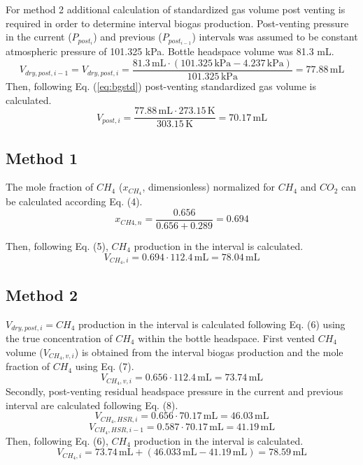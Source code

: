 \documentclass[]{article}
\newcommand{\unit}[1]{\ensuremath{\, \mathrm{#1}}}
\begin{document}
For method 2 additional calculation of standardized gas volume post venting is required in order to determine interval biogas production. 
Post-venting pressure in the current ($P_{post_{i}}$) and previous ($P_{post_{i-1}}$) intervals was assumed to be constant atmospheric pressure of 101.325 kPa. 
Bottle headspace volume was 81.3 mL. 
\begin{equation*}
   V_{dry,post,i-1} = V_{dry,post,i} = \frac{81.3\unit{mL} \cdot (101.325\unit{kPa} - 4.237\unit{kPa})}{101.325\unit{kPa}} = 77.88\unit{mL}  
\end{equation*}
Then, following Eq. (\ref{eq:bgstd}) post-venting standardized gas volume is calculated.
\begin{equation*}
    V_{post,i} = \frac{77.88\unit{mL} \cdot 273.15\unit{K}}{303.15\unit{K}} = 70.17\unit{mL}  
\end{equation*}

\subsection{Method 1}
The mole fraction of $CH_{4}$ ($x_{CH_4}$, dimensionless) normalized for $CH_{4}$ and $CO_{2}$ can be calculated according Eq. (4).
\begin{equation*}
    x_{CH{4},n} = \frac{0.656}{0.656 + 0.289} = 0.694
\end{equation*}

Then, following Eq. (5), $CH_{4}$ production in the interval is calculated.
\begin{equation*}
  V_{CH_4, i} = 0.694 \cdot 112.4\unit{mL}  = 78.04\unit{mL} 
\end{equation*}

\subsection{Method 2}
$V_{dry,post,i} =CH_{4}$ production in the interval is calculated following Eq. (6) using the true concentration of $CH_{4}$ within the bottle headspace.
First vented $CH_{4}$ volume ($V_{CH_4, v,i}$) is obtained from the interval biogas production and the mole fraction of $CH_{4}$ using Eq. (7).
\begin{equation*}
  V_{CH_4, v, i} = 0.656 \cdot 112.4\unit{mL}  = 73.74\unit{mL} 
\end{equation*}
Secondly, post-venting residual headspace pressure in the current and previous interval are calculated following Eq. (8).
\begin{equation*}
  V_{CH_4, HSR, i} = 0.656 \cdot 70.17\unit{mL}  = 46.03\unit{mL} 
\end{equation*}
\begin{equation*}
  V_{CH_4, HSR, i-1} = 0.587 \cdot 70.17\unit{mL}  = 41.19\unit{mL} 
\end{equation*}
Then, following Eq. (6), $CH_{4}$ production in the interval is calculated.
\begin{equation*}
  V_{CH_{4},i} = 73.74\unit{mL} + (46.033\unit{mL} - 41.19\unit{mL})  = 78.59\unit{mL} 
\end{equation*}
\end{document}
